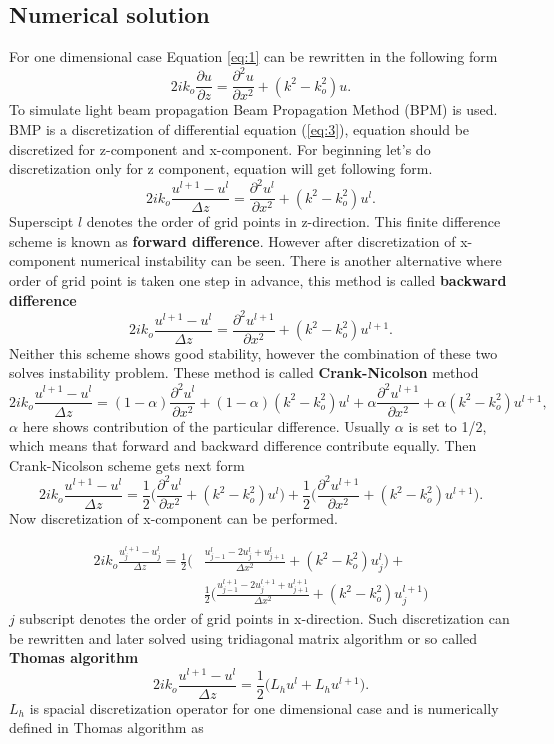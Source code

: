\documentclass[a4paper]{article}
\begin{document}
	\subsection{Numerical solution}
	For one dimensional case Equation \ref{eq:1} can be rewritten in the following form
	\begin{equation}\label{eq:3}
	2ik_o\frac{\partial u}{\partial z}=\frac{\partial^2 u}{\partial x^2}+(k^2-k_o^2)u.
	\end{equation}
	To simulate light beam propagation Beam Propagation Method (BPM) is used. BMP is a discretization of differential equation (\ref{eq:3}), equation should be discretized for z-component and x-component. For beginning let's do discretization only for z component, equation will get following form.
	\[2ik_o\frac{u^{l+1}-u^l}{\Delta z}=\frac{\partial^2 u^l}{\partial x^2}+(k^2-k_o^2)u^l.\]
	Superscipt $l$ denotes the order of grid points in z-direction. This finite difference scheme is known as {\bf forward difference}. However after discretization of x-component numerical instability can be seen. There is another alternative where order of grid point is taken one step in advance, this method is called {\bf backward difference}
	\[2ik_o\frac{u^{l+1}-u^l}{\Delta z}=\frac{\partial^2 u^{l+1}}{\partial x^2}+(k^2-k_o^2)u^{l+1}.\]
	Neither this scheme shows good stability, however the combination of these two solves instability problem. These method is called {\bf Crank-Nicolson} method
	\[2ik_o\frac{u^{l+1}-u^l}{\Delta z}=(1-\alpha)\frac{\partial^2 u^l}{\partial x^2}+(1-\alpha)(k^2-k_o^2)u^l+\alpha \frac{\partial^2 u^{l+1}}{\partial x^2}+\alpha(k^2-k_o^2)u^{l+1},\]
	$\alpha$ here shows contribution of the particular difference. Usually $\alpha$  is set to 1/2, which means that forward and backward difference contribute equally. Then Crank-Nicolson scheme gets next form
	\[2ik_o\frac{u^{l+1}-u^l}{\Delta z}=\frac{1}{2}\bigg(\frac{\partial^2 u^l}{\partial x^2}+(k^2-k_o^2)u^l\bigg)+\frac{1}{2}\bigg(\frac{\partial^2 u^{l+1}}{\partial x^2}+(k^2-k_o^2)u^{l+1}\bigg).\]
	Now discretization of x-component can be performed.

	\begin{equation*}
	\begin{split}
	2ik_o\frac{u_j^{l+1}-u_j^l}{\Delta z}=\frac{1}{2}\bigg(&\frac{u_{j-1}^l-2u_j^l+u_{j+1}^l}{\Delta x^2}+(k^2-k_o^2)u_j^l\bigg)+\\
	& \frac{1}{2}\bigg(\frac{u_{j-1}^{l+1}-2u_j^{l+1}+u_{j+1}^{l+1}}{\Delta x^2}+(k^2-k_o^2)u_j^{l+1}\bigg)
	\end{split}
	\end{equation*}
	$j$ subscript denotes the order of grid points in x-direction. Such discretization can be rewritten and later solved using tridiagonal matrix algorithm or so called {\bf Thomas algorithm}
	\[2ik_o\frac{u^{l+1}-u^l}{\Delta z}=\frac{1}{2}\bigg(L_hu^{l}+L_hu^{l+1}\bigg).\]
	$L_h$ is spacial discretization operator for one dimensional case and is numerically defined in Thomas algorithm as 
\end{document}
